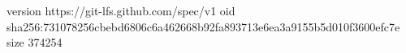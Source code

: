 version https://git-lfs.github.com/spec/v1
oid sha256:731078256cbebd6806c6a462668b92fa893713e6ea3a9155b5d010f3600efc7e
size 374254
